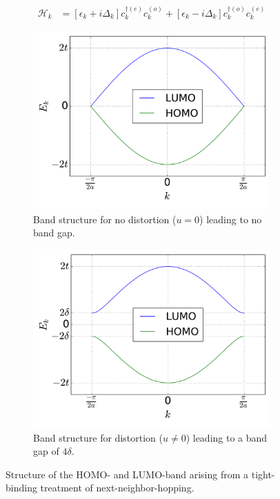 \begin{align}
	\mathcal{H}_k &=
	\left[\epsilon_k + i\Delta_k\right]c_{k}^{\dagger(e)}c_{k}^{(o)} + \left[\epsilon_k-i\Delta_k \right]	c_{k}^{\dagger(o)}c_{k}^{(e)}
\end{align}
\begin{figure}
	\centering
	\begin{subfigure}{0.49\textwidth}
		\includegraphics[width =\textwidth]{Images/Plots/bandstructure_without_gap}
		\caption{Band structure for no distortion ($u = 0$) leading to no band gap.}
		\label{image_bs_wo_gap}
	\end{subfigure}\hspace*{0.2cm}
	\begin{subfigure}{0.49\textwidth}
		\includegraphics[width = \textwidth]{Images/Plots/bandstructure_with_gap}
		\caption{Band structure for distortion ($u \neq 0$) leading to a band gap of $4\delta$.}
		\label{image_bs_w_gap}
	\end{subfigure}
	\caption{Structure of the HOMO- and LUMO-band arising from a tight-binding treatment of next-neighbor-hopping.}
	\label{images_bs}
\end{figure}
